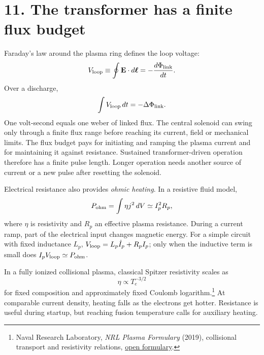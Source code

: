 \documentclass[11pt]{article}
\begin{document}
\section*{11. The transformer has a finite flux budget}
Faraday's law around the plasma ring defines the loop voltage:
\begin{equation}
 V_{\rm loop}\equiv\oint\mathbf E\cdot d\boldsymbol\ell
 =-\frac{d\Phi_{\rm link}}{dt}.
 \label{eq:loopvoltage}
\end{equation}
Over a discharge,
\begin{equation}
 \int V_{\rm loop}\,dt=-\Delta\Phi_{\rm link}.
 \label{eq:voltseconds}
\end{equation}
One volt-second equals one weber of linked flux. The central solenoid can swing only
through a finite flux range before reaching its current, field or mechanical limits.
The flux budget pays for initiating and ramping the plasma current and for maintaining
it against resistance. Sustained transformer-driven operation therefore has a finite
pulse length. Longer operation needs another source of current or a new pulse after
resetting the solenoid.

Electrical resistance also provides \emph{ohmic heating}. In a resistive fluid model,
\begin{equation}
 P_{\rm ohm}=\int\eta j^2\,dV\simeq I_p^2R_p,
 \label{eq:ohmic}
\end{equation}
where $\eta$ is resistivity and $R_p$ an effective plasma resistance. During a current
ramp, part of the electrical input changes magnetic energy. For a simple circuit with
fixed inductance $L_p$, $V_{\rm loop}=L_p\dot I_p+R_pI_p$; only when the inductive
term is small does $I_pV_{\rm loop}\simeq P_{\rm ohm}$.

In a fully ionized collisional plasma, classical Spitzer resistivity scales as
\begin{equation}
 \eta\propto T_e^{-3/2}
 \label{eq:spitzer}
\end{equation}
for fixed composition and approximately fixed Coulomb logarithm.\footnote{Naval
Research Laboratory, \emph{NRL Plasma Formulary} (2019), collisional transport and
resistivity relations, \href{https://www.nrl.navy.mil/Portals/38/PDF\%20Files/NRL_Plasma_Formulary_2019.pdf}{open formulary}.}
At comparable current density, heating falls as the electrons get hotter. Resistance
is useful during startup, but reaching fusion temperature calls for auxiliary heating.
\end{document}
